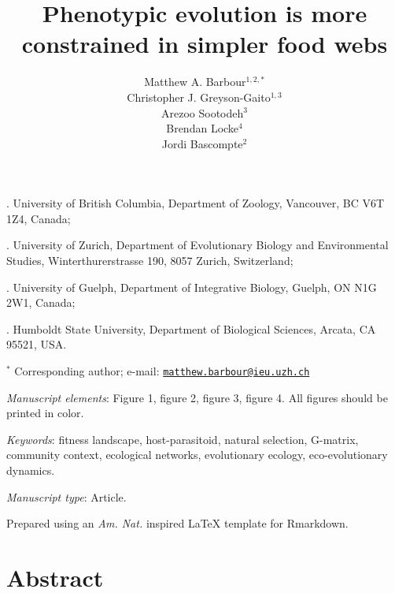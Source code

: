 \documentclass[11pt,]{article}
\title{Phenotypic evolution is more constrained in simpler food webs}
\author{Matthew A. Barbour\(^{1,2,\ast}\) \\ Christopher J. Greyson-Gaito\(^{1,3}\) \\ Arezoo Sootodeh\(^{3}\) \\ Brendan Locke\(^{4}\) \\ Jordi Bascompte\(^{2}\)}
\date{}
\begin{document}
\maketitle


. University of British Columbia, Department of Zoology,
Vancouver, BC V6T 1Z4, Canada;

. University of Zurich, Department of Evolutionary Biology
and Environmental Studies, Winterthurerstrasse 190, 8057 Zurich,
Switzerland;

. University of Guelph, Department of Integrative Biology,
Guelph, ON N1G 2W1, Canada;

. Humboldt State University, Department of Biological
Sciences, Arcata, CA 95521, USA.

\(^\ast\) Corresponding author; e-mail:
\href{mailto:matthew.barbour@ieu.uzh.ch}{\nolinkurl{matthew.barbour@ieu.uzh.ch}}

\bigskip

\emph{Manuscript elements}: Figure 1, figure 2, figure 3, figure 4. All
figures should be printed in color.

\bigskip

\emph{Keywords}: fitness landscape, host-parasitoid, natural selection,
G-matrix, community context, ecological networks, evolutionary ecology,
eco-evolutionary dynamics.

\bigskip

\emph{Manuscript type}: Article.

\bigskip

\footnotesize Prepared using an \emph{Am. Nat.} inspired \LaTeX{}
template for Rmarkdown. \normalsize

\linenumbers{} \modulolinenumbers[3]

\newpage

\section{Abstract}\label{abstract}
\end{document}
